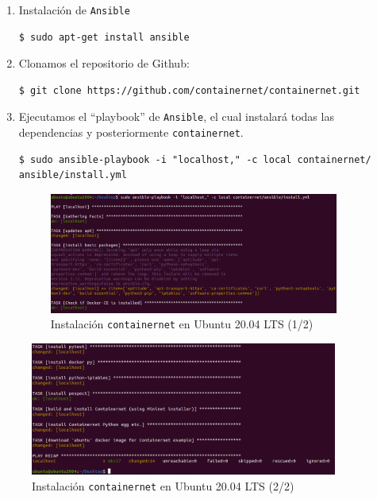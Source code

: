 \documentclass[a4paper, oneside, 12pt]{book}
\begin{document}
	\begin{enumerate}
		\item Instalación de \texttt{Ansible}
		\begin{verbatim}
$ sudo apt-get install ansible
		\end{verbatim}
	
		\item Clonamos el repositorio de Github:
		\begin{verbatim}
$ git clone https://github.com/containernet/containernet.git
		\end{verbatim}
	
		\item Ejecutamos el ``playbook'' de \texttt{Ansible}, el cual instalará todas las dependencias y posteriormente \texttt{containernet}.
		\begin{verbatim}
$ sudo ansible-playbook -i "localhost," -c local containernet/
ansible/install.yml
		\end{verbatim}
	
		\begin{figure}[h!]
			\begin{center}
				\includegraphics[width=0.9\textwidth]{img/cn_install1.png}
				\caption{Instalación \texttt{containernet} en Ubuntu 20.04 LTS (1/2)}	
			\end{center}
		\end{figure}
	\end{enumerate}
	
	\pagebreak
	
	\begin{figure}[h!]
		\begin{center}
			\includegraphics[width=0.9\textwidth]{img/cn_install2.png}
			\caption{Instalación \texttt{containernet} en Ubuntu 20.04 LTS (2/2)}
			\label{img: containernet install}
		\end{center}
	\end{figure}
	
\end{document}
